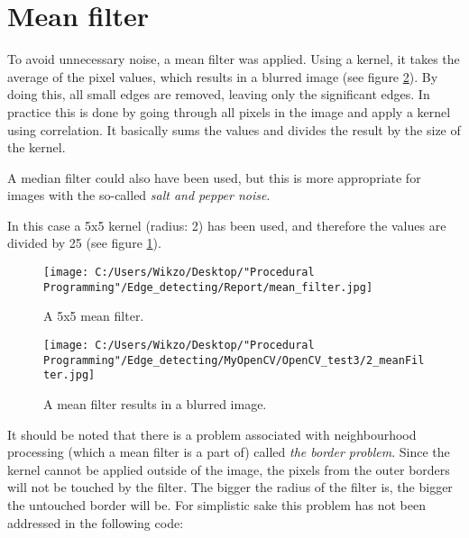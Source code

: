 \section{Mean filter}
To avoid unnecessary noise, a mean filter was applied. Using a kernel, it takes the average of the pixel values, which results in a blurred image (see figure \ref{mean_blur}). By doing this, all small edges are removed, leaving only the significant edges. In practice this is done by going through all pixels in the image and apply a kernel using correlation. It basically sums the values and divides the result by the size of the kernel.

A median filter could also have been used, but this is more appropriate for images with the so-called \textit{salt and pepper noise}.

In this case a 5x5 kernel (radius: 2) has been used, and therefore the values are divided by 25 (see figure \ref{mean_filter_kernel}).

\begin{figure} [htbp]
\texttt{[image: C:/Users/Wikzo/Desktop/"Procedural Programming"/Edge\_detecting/Report/mean\_filter.jpg]}
\centering
\caption{A 5x5 mean filter.}
\label{mean_filter_kernel}
\end{figure}

\begin{figure} [htbp]
\texttt{[image: C:/Users/Wikzo/Desktop/"Procedural Programming"/Edge\_detecting/MyOpenCV/OpenCV\_test3/2\_meanFilter.jpg]}
\centering
\caption{A mean filter results in a blurred image.}
\label{mean_blur}
\end{figure}

It should be noted that there is a problem associated with neighbourhood processing (which a mean filter is a part of) called \textit{the border problem}. Since the kernel cannot be applied outside of the image, the pixels from the outer borders will not be touched by the filter. The bigger the radius of the filter is, the bigger the untouched border will be. For simplistic sake this problem has not been addressed in the following code:

